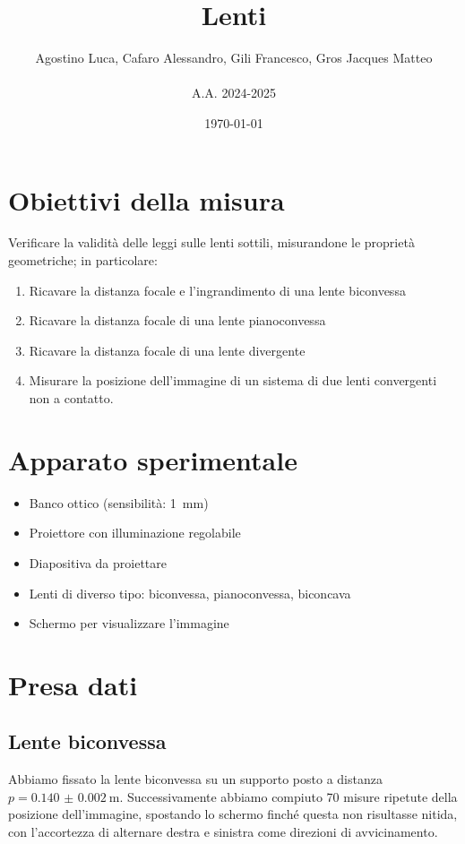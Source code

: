 \documentclass[a4paper]{article}
\title{Lenti}
\author{Agostino Luca, Cafaro Alessandro, Gili Francesco, Gros Jacques Matteo\\ \\A.A. 2024-2025}
\date{\today}
\begin{document}
    
\maketitle

\tableofcontents
\newpage

\section{Obiettivi della misura}
    Verificare la validità delle leggi sulle lenti sottili, misurandone le proprietà geometriche; in particolare:
    \begin{enumerate}
        \item Ricavare la distanza focale e l'ingrandimento di una lente biconvessa
        \item Ricavare la distanza focale di una lente pianoconvessa
        \item Ricavare la distanza focale di una lente divergente
        \item Misurare la posizione dell'immagine di un sistema di due lenti convergenti non a contatto.
    \end{enumerate}
\section{Apparato sperimentale}
    \begin{itemize}
        \item Banco ottico (sensibilità: \SI{1}{\mm})
        \item Proiettore con illuminazione regolabile
        \item Diapositiva da proiettare
        \item Lenti di diverso tipo: biconvessa, pianoconvessa, biconcava
        \item Schermo per visualizzare l'immagine
    \end{itemize}
\section{Presa dati}
    \subsection{Lente biconvessa}\label{sec:biconvessa}
        Abbiamo fissato la lente biconvessa su un supporto posto a distanza $p=\SI{0.140(2)}{\m}$. Successivamente abbiamo compiuto 70 misure ripetute della posizione dell'immagine, spostando lo schermo finché questa non risultasse nitida, con l'accortezza di alternare destra e sinistra come direzioni di avvicinamento.
\end{document}
